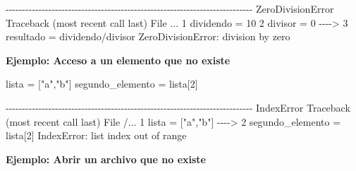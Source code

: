 \documentclass[
  letterpaper,
  DIV=11,
  numbers=noendperiod]{scrreprt}
\newenvironment{Shaded}{\begin{snugshade}}{\end{snugshade}}
\newcommand{\DecValTok}[1]{\textcolor[rgb]{0.68,0.00,0.00}{#1}}
\newcommand{\ErrorTok}[1]{\textcolor[rgb]{0.68,0.00,0.00}{#1}}
\newcommand{\ExtensionTok}[1]{\textcolor[rgb]{0.00,0.23,0.31}{#1}}
\newcommand{\KeywordTok}[1]{\textcolor[rgb]{0.00,0.23,0.31}{#1}}
\newcommand{\NormalTok}[1]{\textcolor[rgb]{0.00,0.23,0.31}{#1}}
\newcommand{\OperatorTok}[1]{\textcolor[rgb]{0.37,0.37,0.37}{#1}}
\newcommand{\PreprocessorTok}[1]{\textcolor[rgb]{0.68,0.00,0.00}{#1}}
\newcommand{\SpecialStringTok}[1]{\textcolor[rgb]{0.13,0.47,0.30}{#1}}
\newcommand{\StringTok}[1]{\textcolor[rgb]{0.13,0.47,0.30}{#1}}
\begin{document}
\begin{Shaded}
\begin{Highlighting}[]
\ExtensionTok{{-}{-}{-}{-}{-}{-}{-}{-}{-}{-}{-}{-}{-}{-}{-}{-}{-}{-}{-}{-}{-}{-}{-}{-}{-}{-}{-}{-}{-}{-}{-}{-}{-}{-}{-}{-}{-}{-}{-}{-}{-}{-}{-}{-}{-}{-}{-}{-}{-}{-}{-}{-}{-}{-}{-}{-}{-}{-}{-}{-}{-}{-}{-}{-}{-}{-}{-}{-}{-}{-}{-}{-}{-}{-}{-}}
\ExtensionTok{ZeroDivisionError}\NormalTok{                         Traceback }\ErrorTok{(}\ExtensionTok{most}\NormalTok{ recent call last}\KeywordTok{)}
\ExtensionTok{File}\NormalTok{ ...}
      \ExtensionTok{1}\NormalTok{ dividendo = 10}
      \ExtensionTok{2}\NormalTok{ divisor = 0}
\ExtensionTok{{-}{-}{-}{-}}\OperatorTok{\textgreater{}}\NormalTok{ 3 resultado = dividendo/divisor }
\ExtensionTok{ZeroDivisionError:}\NormalTok{ division by zero}
\end{Highlighting}
\end{Shaded}

\textbf{Ejemplo: Acceso a un elemento que no existe}

\begin{Shaded}
\begin{Highlighting}[]
\NormalTok{lista }\OperatorTok{=}\NormalTok{ [}\StringTok{"a"}\NormalTok{,}\StringTok{"b"}\NormalTok{]}
\NormalTok{segundo\_elemento }\OperatorTok{=}\NormalTok{ lista[}\DecValTok{2}\NormalTok{]}
\end{Highlighting}
\end{Shaded}

\begin{Shaded}
\begin{Highlighting}[]
\ExtensionTok{{-}{-}{-}{-}{-}{-}{-}{-}{-}{-}{-}{-}{-}{-}{-}{-}{-}{-}{-}{-}{-}{-}{-}{-}{-}{-}{-}{-}{-}{-}{-}{-}{-}{-}{-}{-}{-}{-}{-}{-}{-}{-}{-}{-}{-}{-}{-}{-}{-}{-}{-}{-}{-}{-}{-}{-}{-}{-}{-}{-}{-}{-}{-}{-}{-}{-}{-}{-}{-}{-}{-}{-}{-}{-}{-}}
\ExtensionTok{IndexError}\NormalTok{                                Traceback }\ErrorTok{(}\ExtensionTok{most}\NormalTok{ recent call last}\KeywordTok{)}
\ExtensionTok{File}\NormalTok{ /...}
      \ExtensionTok{1}\NormalTok{ lista = }\PreprocessorTok{[}\StringTok{"a"}\SpecialStringTok{,}\StringTok{"b"}\PreprocessorTok{]}
\ExtensionTok{{-}{-}{-}{-}}\OperatorTok{\textgreater{}}\NormalTok{ 2 segundo\_elemento = lista}\PreprocessorTok{[}\SpecialStringTok{2}\PreprocessorTok{]}
\ExtensionTok{IndexError:}\NormalTok{ list index out of range}
\end{Highlighting}
\end{Shaded}

\textbf{Ejemplo: Abrir un archivo que no existe}
\end{document}
